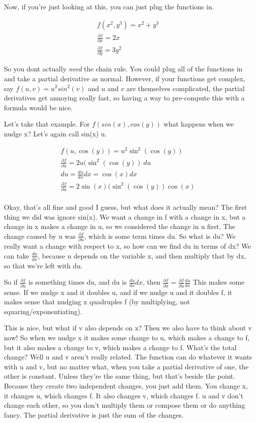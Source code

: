 \documentclass[12pt, letterpaper]{article}
\begin{document}
Now, if you're just looking at this, you can just plug the functions in.

\begin{gather*}
    f(x^2, y^3) = x^2 + y^3\\
    \frac{\partial f}{\partial x} = 2x \\
    \frac{\partial f}{\partial y} = 3y^2
\end{gather*}

So you dont actually \emph{need} the chain rule. You could plug all of the functions in and take a partial derivative as normal.
However, if your functions get complex, say $f(u, v) = u^2sin^2(v)$ and $u$ and $v$ are themselves complicated, the partial derivatives get annoying really fast, so having a way to pre-compute this with a formula would be nice.

Let's take that example. For $f(sin(x), cos(y))$ what happens when we nudge x? Let's again call sin(x) u.

\begin{gather*}
    f(u, \cos(y)) = u^2\sin^2(\cos(y))\\
    \frac{\partial f}{\partial u} = 2u(\sin^2(\cos(y))\ du\\
    du = \frac{du}{dx}dx = \cos(x) dx\\
    \frac{\partial f}{\partial u} = 2\sin(x)(\sin^2(\cos(y))\cos(x)\\
\end{gather*}

Okay, that's all fine and good I guess, but what does it actually mean? The first thing we did was ignore sin(x). We want a change in f with a change in x, but a change in x makes a change in u, so we considered the change in u first.
The change caused by u was $\frac{\partial f}{\partial u}$, which is some term times du. So what is du? We really want a change with respect to x, so how can we find du in terms of dx?
We can take $\frac{du}{dx}$, because u depends on the variable x, and then multiply that by dx, so that we're left with du.

So if $\frac{\partial f}{\partial u}$ is something times du, and du is $\frac{du}{dx} dx$, then $\frac{\partial f}{\partial x} = \frac{\partial f}{\partial u} \frac{du}{dx}$
This makes some sense. If we nudge x and it doubles u, and if we nudge u and it doubles f, it makes sense that nudging x quadruples f (by multiplying, not squaring/exponentiating).

This is nice, but what if v also depends on x? Then we also have to think about v now! So when we nudge x it makes some change to u, which makes a change to f, but it also makes a change to v, which makes a change to f. What's the total change?
Well u and v aren't really related. The function can do whatever it wants with u and v, but no matter what, when you take a partial derivative of one, the other is constant. Unless they're the same thing, but that's beside the point.
Because they create two independent changes, you just add them. You change x, it changes u, which changes f. It also changes v, which changes f. u and v don't change each other, so you don't multiply them or compose them or do anything fancy. The partial derivative is just the sum of the changes.
\end{document}
